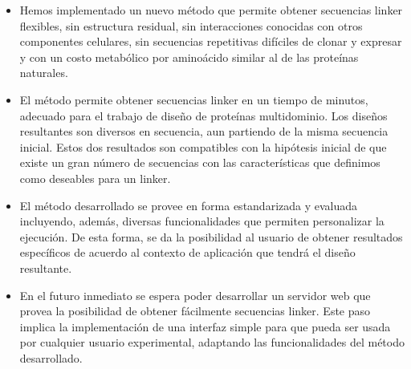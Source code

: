 \begin{itemize}

 \item Hemos implementado un nuevo método que permite obtener secuencias linker flexibles, sin estructura residual, sin interacciones conocidas con otros componentes celulares, sin secuencias repetitivas difíciles de clonar y expresar y con un costo metabólico por aminoácido similar al de las proteínas naturales.

\item El método permite obtener secuencias linker en un tiempo de minutos, adecuado para el trabajo de diseño de proteínas multidominio. Los diseños resultantes son diversos en secuencia, aun partiendo de la misma secuencia inicial. Estos dos resultados son compatibles con la hipótesis inicial de que existe un gran número de secuencias con las características que definimos como deseables para un linker.

 \item El método desarrollado se provee en forma estandarizada y evaluada incluyendo, además, diversas funcionalidades que permiten personalizar la ejecución. De esta forma, se da la posibilidad al usuario de obtener resultados específicos de acuerdo al contexto de aplicación que tendrá el diseño resultante.

 \item En el futuro inmediato se espera poder desarrollar un servidor web que provea la posibilidad de obtener fácilmente secuencias linker. Este paso implica la implementación de una interfaz simple para que pueda ser usada por cualquier usuario experimental, adaptando las funcionalidades del método desarrollado. 
\end{itemize}











% 
% 


% 

